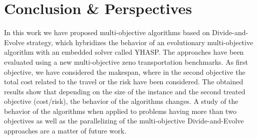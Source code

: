 \documentclass{llncs}
\begin{document}
% 
% 
% 

\section{Conclusion \& Perspectives}
\label{sec:conclusion}
In this work we have proposed multi-objective algorithms based on Divide-and-Evolve strategy, which hybridizes
the behavior of an evolutionary  multi-objective algorithm with an embedded solver called YHASP. 
The approaches have been evaluated using a  new multi-objective zeno transportation benchmarks. 
As first objective, we have considered the makespan, where in the second objective
the total cost related to the travel or the risk have been considered.
The obtained results show that  depending on the size of the instance and the second treated objective (cost/risk),  the behavior of the algorithms changes.
A study of the behavior of the algorithms when applied to problems having more than two objectives  as well as the parallelizing of the multi-objective Divide-and-Evolve approaches are  a matter of future work.


\end{document}
